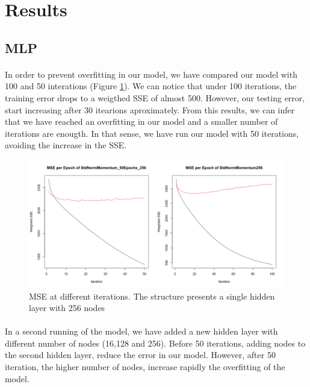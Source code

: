\documentclass[11.5pt]{article}
\newcounter{Figure}
\newcounter{graphics}
\begin{document}
\section{Results}
\subsection{MLP}
\paragraph{} In order to prevent overfitting in our model, we have compared our model with 100 and 50 interations (Figure \ref{256-epoch50-100}). We can notice that under 100 iterations, the training error drops to a weigthed SSE of almost 500. However, our testing error, start increasing after 30 itearions aproximately. From this results, we can infer that we have reached an overfitting in our model and a smaller number of iterations are enougth. In that sense, we have run our model with 50 iterations, avoiding the increase in the SSE.
 

\begin{figure}[h!]
 \includegraphics[width=1\textwidth]{report_mlp/50_100_256.png}
  \caption{\small MSE at different iterations. The structure presents a single hidden layer with 256 nodes}
  \label{256-epoch50-100}
\end{figure}


\paragraph{} In a second running of the model, we have added a new hidden layer  with different number of nodes (16,128 and 256). Before 50 iterations, adding nodes to the second hidden layer, reduce the error in our model. However, after 50 iteration, the higher number of nodes, increase rapidly the overfitting  of the model. 
\end{document}
